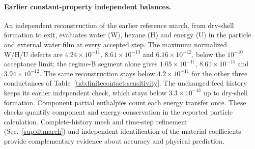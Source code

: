 \paragraph{Earlier constant-property independent balances.}
An independent reconstruction of the earlier reference march, from dry-shell
formation to exit, evaluates water (W), hexane (H) and energy (U) in the
particle and external water film at every accepted step. The maximum
normalized W/H/U defects are $4.24\times10^{-11}$, $8.61\times10^{-13}$ and $6.16\times10^{-12}$,
below the $10^{-10}$ acceptance limit; the regime-B segment alone gives
$1.05\times10^{-11}$, $8.61\times10^{-13}$ and $3.94\times10^{-12}$. The
same reconstruction stays below $4.2\times10^{-11}$ for the other three
conductances of Table~\ref{tab:finitecontact:sensitivity}. The
unchanged feed history keeps its earlier independent check, which stays
below $3.3\times10^{-13}$ up to dry-shell formation. Component partial
enthalpies count each energy transfer once. These checks quantify component and energy conservation in the reported
particle calculation. Complete-history mesh and time-step refinement
(Sec.~\ref{sup:dtmarch}) and independent identification of the material
coefficients provide complementary evidence about accuracy and physical
prediction.
